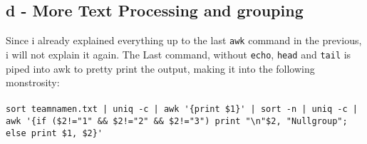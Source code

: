 \documentclass[a4paper, 11pt]{article}
\begin{document}
    \subsection{d - More Text Processing and grouping}
    Since i already explained everything up to the last \texttt{awk} command in the previous, i will not explain it again.
    The Last command, without \texttt{echo}, \texttt{head} and \texttt{tail} is piped into awk to pretty print the output, making it into the following monstrosity:
    \\\\
    \lstinline+sort teamnamen.txt | uniq -c | awk '{print $1}' | sort -n | uniq -c | awk '{if ($2!="1" && $2!="2" && $2!="3") print "\n"$2, "Nullgroup"; else print $1, $2}'+
\end{document}

